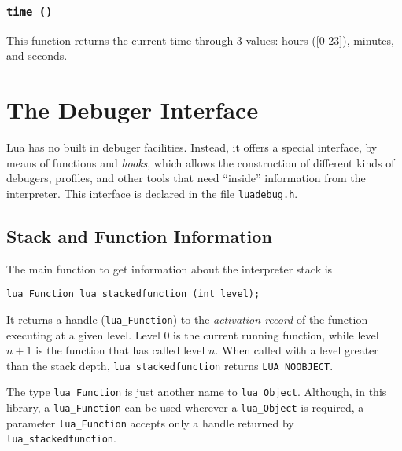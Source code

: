 \subsubsection*{{\tt time ()}}

This function returns the current time through 3 values:
hours ([0-23]), minutes, and seconds.




\section{The Debuger Interface} \label{debugI}

Lua has no built in debuger facilities.
Instead, it offers a special interface,
by means of functions and {\em hooks},
which allows the construction of different
kinds of debugers, profiles, and other tools
that need ``inside'' information from the interpreter.
This interface is declared in the file \verb'luadebug.h'.

\subsection{Stack and Function Information}

The main function to get information about the interpreter stack
is
\begin{verbatim}
lua_Function lua_stackedfunction (int level);
\end{verbatim}
It returns a handle (\verb'lua_Function') to the {\em activation record}
of the function executing at a given level.
Level 0 is the current running function,
while level $n+1$ is the function that has called level $n$.
When called with a level greater than the stack depth,
\verb'lua_stackedfunction' returns \verb'LUA_NOOBJECT'.

The type \verb'lua_Function' is just another name
to \verb'lua_Object'.
Although, in this library,
a \verb'lua_Function' can be used wherever a \verb'lua_Object' is required,
a parameter \verb'lua_Function' accepts only a handle returned by
\verb'lua_stackedfunction'.

